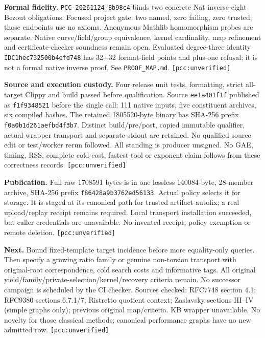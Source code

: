 \documentclass[10pt]{article}
\begin{document}
\textbf{Formal fidelity.} \texttt{PCC-20261124-8b98c4} binds two concrete Nat
inverse-eight Bezout obligations. Focused project gate: two named, zero
failing, zero trusted; those endpoints use no axioms. Anonymous Mathlib
homomorphism probes are separate. Native curve/field/group equivalence,
kernel cardinality, map refinement and certificate-checker soundness remain
open. Evaluated degree-three identity \texttt{IDC1hec732500b4efd748} has 32+32
format-field points and plus-one refusal; it is not a formal native inverse
proof. See \texttt{PROOF\_MAP.md}. \texttt{[pcc:unverified]}

\textbf{Source and execution custody.} Four release unit tests, formatting,
strict all-target Clippy and build passed before qualification. Source
\texttt{ee1a401f1f} published as \texttt{f1f9348521} before the single call:
111 native inputs, five constituent archives, six compiled hashes.
The retained 1805520-byte binary has SHA-256 prefix
\texttt{f0a0b1d261aefbd4f3b7}. Distinct build/pre/post, copied immutable
qualifier, actual wrapper transport and separate stdout are retained. No
qualified source edit or test/worker rerun followed. All standing is producer
unsigned. No GAE, timing, RSS, complete cold cost, fastest-tool or exponent
claim follows from these correctness records. \texttt{[pcc:unverified]}

\textbf{Publication.} Full raw 1708591 bytes is in one lossless 140084-byte,
28-member archive, SHA-256 prefix \texttt{f86428a9b3762ed56133}. Actual policy
selects it for storage. It is staged at its canonical path for trusted
artifact-autofix; a real upload/replay receipt remains required. Local
transport installation succeeded, but caller credentials are unavailable.
No invented receipt, policy exemption or remote deletion.
\texttt{[pcc:unverified]}

\textbf{Next.} Bound fixed-template target incidence before more equality-only
queries. Then specify a growing ratio family or genuine non-torsion transport
with original-root correspondence, cold search costs and informative tags.
All original yield/family/private-selection/kernel/recovery criteria remain.
No successor campaign is scheduled by the CI checker. Sources checked:
RFC7748 section 4.1; RFC9380 sections 6.7.1/7; Ristretto quotient context;
Zaslavsky sections III--IV (simple graphs only); previous original map/criteria.
KB wrapper unavailable. No novelty for those classical methods; canonical
performance graphs have no new admitted row. \texttt{[pcc:unverified]}
\end{document}

